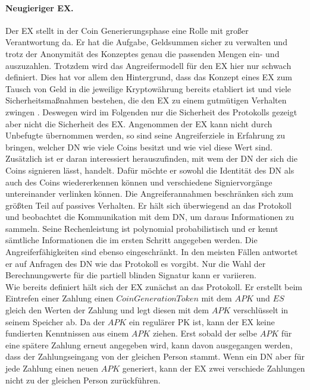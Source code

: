 \documentclass[
	fontsize=11pt,
	headings=small,
	parskip=half,           %
	bibliography=totoc,
	numbers=noenddot,       %
	open=any,               %
]{scrreprt}
\begin{document}
\paragraph{Neugieriger EX.}
Der EX stellt in der Coin Generierungsphase eine Rolle mit großer Verantwortung da. Er hat die Aufgabe, Geldsummen sicher zu verwalten und trotz der Anonymität des Konzeptes genau die passenden Mengen ein- und auszuzahlen. Trotzdem wird das Angreifermodell für den EX hier nur schwach definiert. Dies hat vor allem den Hintergrund, dass das Konzept eines EX zum Tausch von Geld in die jeweilige Kryptowährung bereits etabliert ist und viele Sicherheitsmaßnahmen bestehen, die den EX zu einem gutmütigen Verhalten zwingen \cite{gnu-burdges2016enabling,kim2018risk,baum2021p2dex}. Deswegen wird im Folgenden nur die Sicherheit des Protokolls gezeigt aber nicht die Sicherheit des EX.
Angenommen der EX kann nicht durch Unbefugte übernommen werden, so sind seine Angreiferziele in Erfahrung zu bringen, welcher DN wie viele Coins besitzt und wie viel diese Wert sind. Zusätzlich ist er daran interessiert herauszufinden, mit wem der DN der sich die Coins signieren lässt, handelt. Dafür möchte er sowohl die Identität des DN als auch des Coins wiedererkennen können und verschiedene Signiervorgänge untereinander verlinken können. Die Angreiferannahmen beschränken sich zum größten Teil auf passives Verhalten. Er hält sich überwiegend an das Protokoll und beobachtet die Kommunikation mit dem DN, um daraus Informationen zu sammeln. Seine Rechenleistung ist polynomial probabilistisch und er kennt sämtliche Informationen die im ersten Schritt angegeben werden. Die Angreiferfähigkeiten sind ebenso eingeschränkt. In den meisten Fällen antwortet er auf Anfragen des DN wie das Protokoll es vorgibt. Nur die Wahl der Berechnungswerte für die partiell blinden Signatur kann er variieren.\\

Wie bereits definiert hält sich der EX zunächst an das Protokoll. Er erstellt beim Eintrefen einer Zahlung einen $CoinGenerationToken$ mit dem $APK$ und $ES$ gleich den Werten der Zahlung und legt diesen mit dem $APK$ verschlüsselt in seinem Speicher ab. Da der $APK$ ein regulärer PK ist, kann der EX keine fundierten Kenntnissen aus einem $APK$ ziehen. Erst sobald der selbe $APK$ für eine spätere Zahlung erneut angegeben wird, kann davon ausgegangen werden, dass der Zahlungseingang von der gleichen Person stammt. Wenn ein DN aber für jede Zahlung einen neuen $APK$ generiert, kann der EX zwei verschiede Zahlungen nicht zu der gleichen Person zurückführen.
\end{document}
